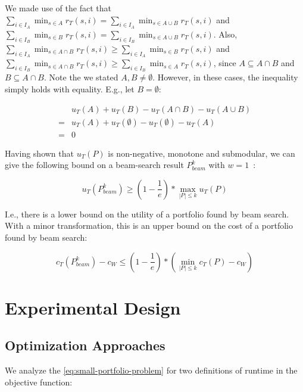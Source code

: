 \documentclass[conference]{IEEEtran}
\begin{document}
We made use of the fact that $\sum_{i \in I_A}{\min_{s \in A}{r_T(s,i)}} = \sum_{i \in I_A}{\min_{s \in A \cup B}{r_T(s,i)}}$ and $\sum_{i \in I_B}{\min_{s \in B}{r_T(s,i)}} = \sum_{i \in I_B}{\min_{s \in A \cup B}{r_T(s,i)}}$.
Also, $\sum_{i \in I_A}{\min_{s \in A \cap B}{r_T(s,i)}} \geq \sum_{i \in I_A}{\min_{s \in B}{r_T(s,i)}}$ and $\sum_{i \in I_B}{\min_{s \in A \cap B}{r_T(s,i)}} \geq \sum_{i \in I_B}{\min_{s \in A}{r_T(s,i)}}$, since $A \subseteq A \cap B$ and $B \subseteq A \cap B$.
Note the we stated $A,B \neq \emptyset$.
However, in these cases, the inequality simply holds with equality.
E.g., let $B = \emptyset$:

\begin{align*}
	& u_{T}(A) + u_{T}(B) - u_{T}(A \cap B) - u_{T}(A \cup B)\\
	= & u_{T}(A) + u_{T}(\emptyset) - u_{T}(\emptyset) - u_{T}(A)\\
	= & 0
\end{align*}

Having shown that $u_{T}(P)$ is non-negative, monotone and submodular, we can give the following bound on a beam-search result $P_{beam}^k$ with $w=1$~\cite{nemhauser1978analysis, krause2014submodular}:

\begin{equation}
	u_{T}(P_{beam}^k) \geq (1 - \frac{1}{e}) * \max_{|P| \leq k}{u_{T}(P)}
\end{equation}

I.e., there is a lower bound on the utility of a portfolio found by beam search.
With a minor transformation, this is an upper bound on the cost of a portfolio found by beam search:

\begin{equation}
	c_{T}(P_{beam}^k) - c_W \leq (1 - \frac{1}{e}) * (\min_{|P| \leq k}{c_{T}(P)} - c_W)
\end{equation}

\section{Experimental Design}
\label{sec:experimental-design}

\subsection{Optimization Approaches}

We analyze the \ref{eq:small-portfolio-problem} for two definitions of runtime in the objective function:
\end{document}
